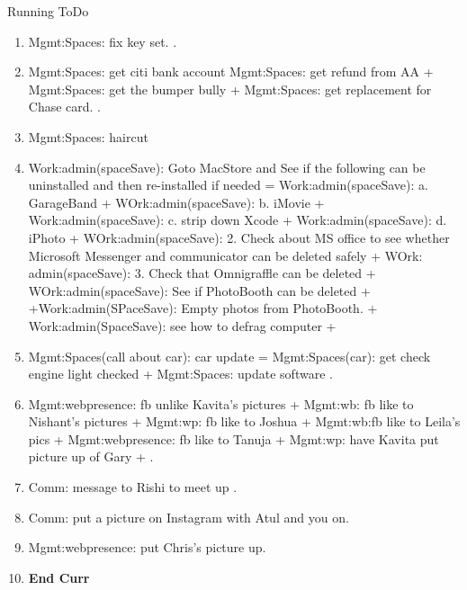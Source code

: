 \begin{columns}
\begin{column}{0.5\linewidth}
\begin{block}{Running ToDo}
\begin{enumerate}
        \item \tiny Mgmt:Spaces: fix key set. . 
        \item \tiny Mgmt:Spaces: get citi bank account
          Mgmt:Spaces: get refund from AA  + Mgmt:Spaces: get the
          bumper bully +  Mgmt:Spaces: get replacement for Chase
          card. .

        \item \tiny Mgmt:Spaces: haircut  
          
        \item \tiny Work:admin(spaceSave): Goto MacStore and See if the following can be uninstalled and then
          re-installed if needed = Work:admin(spaceSave):
          a. GarageBand  + WOrk:admin(spaceSave):  b. iMovie +
          Work:admin(spaceSave): c. strip down Xcode +
          Work:admin(spaceSave): d. iPhoto 
          + WOrk:admin(spaceSave): 2. Check about MS office to see whether Microsoft Messenger and
          communicator can be deleted safely 
          + WOrk: admin(spaceSave): 3. Check that Omnigraffle can be
          deleted + WOrk:admin(spaceSave): See if PhotoBooth can be deleted +
          +Work:admin(SPaceSave): Empty photos from PhotoBooth. 
          + Work:admin(SpaceSave): see how to defrag computer + 
          
        \item \tiny Mgmt:Spaces(call about car): car update = Mgmt:Spaces(car): get check engine light checked +
          Mgmt:Spaces: update software . 

        \item \tiny Mgmt:webpresence: fb unlike Kavita’s pictures + Mgmt:wb:
          fb like to Nishant's pictures +  Mgmt:wp: fb like to Joshua
          + Mgmt:wb:fb like to Leila's pics + Mgmt:webpresence: fb
          like to Tanuja + Mgmt:wp: have Kavita put picture up of Gary  + .


        \item \tiny Comm: message to Rishi to meet up .
        \item \tiny Comm: put a picture on Instagram with Atul and you on. 
        \item \tiny Mgmt:webpresence: put Chris's picture up. 

        \item \tiny  \textbf{End Curr} 


\end{enumerate}
\end{block}
\end{column}
\end{columns}
